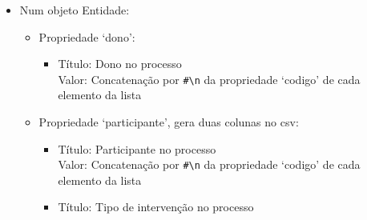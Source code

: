 \begin{itemize}
\begin{itemize}
\begin{itemize}
\begin{itemize}
                \item Título: Tipo de relação entre processos \\
                      Valor: Concatenação por \verb|#\n| da propriedade `idRel' de cada elemento da lista
            \end{itemize}
            \item Propriedade `legislacao', gera duas colunas no \acrshort{csv}:
            \begin{itemize}
                \item Título: Diplomas jurídico-administrativos REF Ids \\
                      Valor: Concatenação por \verb|#\n| da propriedade `idLeg' de cada elemento da lista
                \item Título: Diplomas jurídico-administrativos REF Títulos \\
                      Valor: Cada elemento da lista é mapeado para a concatenação da propriedade `tipo' com a propriedade `numero' com um espaço entre as duas propriedades; Concatenação por \verb|#\n| do mapeamento de cada elemento da lista
            \end{itemize}
            \item Propriedade `filhos': cada elemento deve ser convertido como se tratasse de um objeto classe; 
            Devem ser ignorados os títulos gerados, mantendo apenas os valores numa nova linha do \acrshort{csv}.
        \end{itemize}
        \item Num objeto Entidade:
        \begin{itemize}
            \item Propriedade `dono':
            \begin{itemize}
                \item Título: Dono no processo \\
                      Valor: Concatenação por \verb|#\n| da propriedade `codigo' de cada elemento da lista
            \end{itemize}
            \item Propriedade `participante', gera duas colunas no \acrshort{csv}:
            \begin{itemize}
                \item Título: Participante no processo \\
                      Valor: Concatenação por \verb|#\n| da propriedade `codigo' de cada elemento da lista
                \item Título: Tipo de intervenção no processo \\

\end{itemize}
\end{itemize}
\end{itemize}
\end{itemize}
